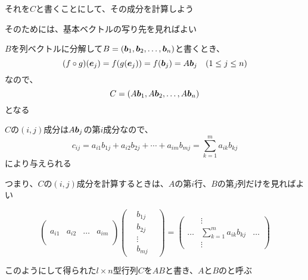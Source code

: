 \documentclass[b5paper,12pt]{jsarticle}
\begin{document}
それを$C$と書くことにして、その成分を計算しよう

そのためには、基本ベクトルの写り先を見ればよい

\br

$B$を列ベクトルに分解して$B = (\vb*{b}_1, \vb*{b}_2, \dots, \vb*{b}_n)$と書くとき、
\begin{equation*}
  (f \circ g)(\vb*{e}_j) = f(g(\vb*{e}_j)) = f(\vb*{b}_j) = A \vb*{b}_j \quad (1 \leq j \leq n)
\end{equation*}
なので、
\begin{equation*}
  C = (A\vb*{b}_1, A\vb*{b}_2, \dots, A\vb*{b}_n)
\end{equation*}
となる

$C$の$(i, j)$成分は$A\vb*{b}_j$の第$i$成分なので、
\begin{equation*}
  c_{ij} = a_{i1} b_{1j} + a_{i2} b_{2j} + \cdots + a_{im} b_{mj} = \sum_{k=1}^m a_{ik} b_{kj}
\end{equation*}
により与えられる

つまり、$C$の$(i, j)$成分を計算するときは、$A$の第$i$行、$B$の第$j$列だけを見ればよい

\begin{equation*}
  \begin{pmatrix}
           &        &       &        \\
           &        &       &        \\
    a_{i1} & a_{i2} & \dots & a_{im} \\
           &        &       &        \\
           &        &       &
  \end{pmatrix}
  \begin{pmatrix}
     & b_{1j} & \\
     & b_{2j} & \\
     & \vdots & \\
     & b_{mj} &
  \end{pmatrix} = \begin{pmatrix}
          & \vdots                                  &       \\
    \dots & \displaystyle\sum_{k=1}^m a_{ik} b_{kj} & \dots \\
          & \vdots                                  &
  \end{pmatrix}
\end{equation*}

\br

このようにして得られた$l \times n$型行列$C$を$AB$と書き、$A$と$B$のと呼ぶ
\end{document}
